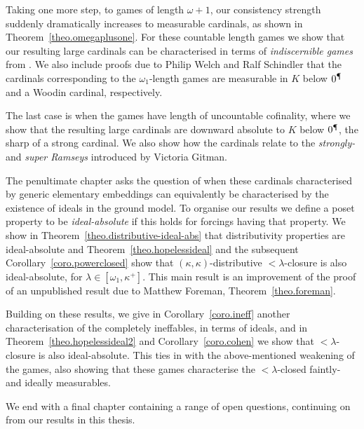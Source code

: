 \documentclass[../main]{subfiles}
\begin{document}
\begin{onehalfspacing}
\quad Taking one more step, to games of length $\omega+1$, our consistency strength suddenly dramatically increases to measurable cardinals, as shown in Theorem~\ref{theo.omegaplusone}. For these countable length games we show that our resulting large cardinals can be characterised in terms of \textit{indiscernible games} from \cite{SharpeWelch}. We also include proofs due to Philip Welch and Ralf Schindler that the cardinals corresponding to the $\omega_1$-length games are measurable in $K$ below $0^\mathparagraph$ and a Woodin cardinal, respectively.

\quad The last case is when the games have length of uncountable cofinality, where we show that the resulting large cardinals are downward absolute to $K$ below $0^\mathparagraph$, the sharp of a strong cardinal. We also show how the cardinals relate to the \textit{strongly-} and \textit{super Ramseys} introduced by Victoria Gitman.

\quad The penultimate chapter asks the question of when these cardinals characterised by generic elementary embeddings can equivalently be characterised by the existence of ideals in the ground model. To organise our results we define a poset property to be \textit{ideal-absolute} if this holds for forcings having that property. We show in Theorem~\ref{theo.distributive-ideal-abs} that distributivity properties are ideal-absolute and Theorem~\ref{theo.hopelessideal} and the subsequent Corollary~\ref{coro.powerclosed} show that $(\kappa,\kappa)$-distributive ${<}\lambda$-closure is also ideal-absolute, for $\lambda\in[\omega_1,\kappa^+]$. This main result is an improvement of the proof of an unpublished result due to Matthew Foreman, Theorem~\ref{theo.foreman}. 

\quad Building on these results, we give in Corollary~\ref{coro.ineff} another characterisation of the completely ineffables, in terms of ideals, and in Theorem~\ref{theo.hopelessideal2} and Corollary~\ref{coro.cohen} we show that ${<}\lambda$-closure is also ideal-absolute. This ties in with the above-mentioned weakening of the games, also showing that these games characterise the ${<}\lambda$-closed faintly- and ideally measurables.

\quad We end with a final chapter containing a range of open questions, continuing on from our results in this thesis.

\end{onehalfspacing}
\setlength{\parindent}{0pt}
\end{document}
